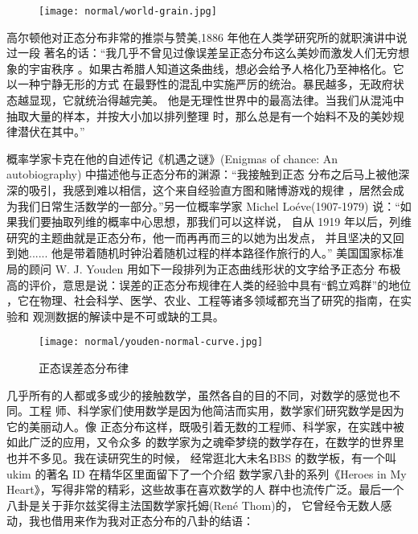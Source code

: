 \begin{figure}[ht]
\centering
\texttt{[image: normal/world-grain.jpg]}
\end{figure}

高尔顿他对正态分布非常的推崇与赞美,1886 年他在人类学研究所的就职演讲中说过一段
著名的话：“我几乎不曾见过像误差呈正态分布这么美妙而激发人们无穷想象的宇宙秩序
。如果古希腊人知道这条曲线，想必会给予人格化乃至神格化。它以一种宁静无形的方式
在最野性的混乱中实施严厉的统治。暴民越多，无政府状态越显现，它就统治得越完美。
他是无理性世界中的最高法律。当我们从混沌中抽取大量的样本，并按大小加以排列整理
时，那么总是有一个始料不及的美妙规律潜伏在其中。”

概率学家卡克在他的自述传记《机遇之谜》(Enigmas of chance: An autobiography)
中描述他与正态分布的渊源：“我接触到正态
分布之后马上被他深深的吸引，我感到难以相信，这个来自经验直方图和赌博游戏的规律
，居然会成为我们日常生活数学的一部分。”另一位概率学家 Michel
Lo\'{e}ve(1907-1979) 说：“如果我们要抽取列维的概率中心思想，那我们可以这样说，
自从 1919 年以后，列维研究的主题曲就是正态分布，他一而再再而三的以她为出发点，
并且坚决的又回到她......  他是带着随机时钟沿着随机过程的样本路径作旅行的人。”
美国国家标准局的顾问 W. J. Youden 用如下一段排列为正态曲线形状的文字给予正态分
布极高的评价，意思是说：误差的正态分布规律在人类的经验中具有“鹤立鸡群”的地位
，它在物理、社会科学、医学、农业、工程等诸多领域都充当了研究的指南，在实验和
观测数据的解读中是不可或缺的工具。

\begin{figure}[ht]
\centering
\texttt{[image: normal/youden-normal-curve.jpg]}
\caption{正态误差态分布律}
\end{figure}

几乎所有的人都或多或少的接触数学，虽然各自的目的不同，对数学的感觉也不同。工程
师、科学家们使用数学是因为他简洁而实用，数学家们研究数学是因为它的美丽动人。像
正态分布这样，既吸引着无数的工程师、科学家，在实践中被如此广泛的应用，又令众多
的数学家为之魂牵梦绕的数学存在，在数学的世界里也并不多见。我在读研究生的时候，
经常逛北大未名BBS 的数学板，有一个叫 ukim 的著名 ID 在精华区里面留下了一个介绍
数学家八卦的系列《Heroes in My Heart》，写得非常的精彩，这些故事在喜欢数学的人
群中也流传广泛。最后一个八卦是关于菲尔兹奖得主法国数学家托姆(Ren\'{e} Thom)的，
它曾经令无数人感动，我也借用来作为我对正态分布的八卦的结语：

\begin{quotation}
\end{quotation}

